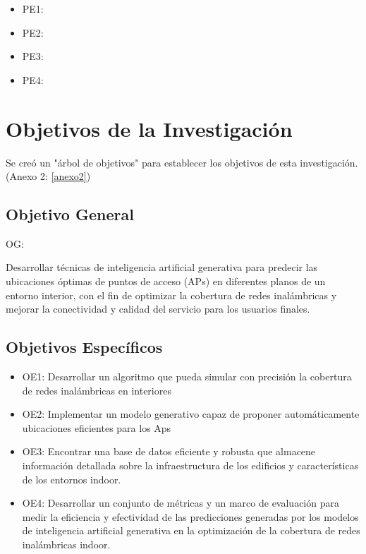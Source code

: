 \begin{itemize}
	\item PE1: {\Pbone}
	\item PE2: {\Pbtwo}
	\item PE3: {\Pbthree}
	\item PE4: {\Pbfour}
\end{itemize}

\section{Objetivos de la Investigación}
Se creó un "árbol de objetivos" para establecer los objetivos de esta investigación. (Anexo 2: \ref{anexo2})
\subsection{Objetivo General}
OG: \newcommand{\ObjetivoGeneral}{
Desarrollar técnicas de inteligencia artificial generativa para predecir las ubicaciones óptimas de puntos de acceso (APs) en diferentes planos de un entorno interior, con el fin de optimizar la cobertura de redes inalámbricas y mejorar la conectividad y calidad del servicio para los usuarios finales.
}
\ObjetivoGeneral
\subsection{Objetivos Específicos}
\newcommand{\Objone}{
Desarrollar un algoritmo que pueda simular con precisión la cobertura de redes inalámbricas en interiores
}
\newcommand{\Objtwo}{
Implementar un modelo generativo capaz de proponer automáticamente ubicaciones eficientes para los Aps
}
\newcommand{\Objthree}{
Encontrar una base de datos eficiente y robusta que almacene información detallada sobre la infraestructura de los edificios y características de los entornos indoor.
}
\newcommand{\Objfour}{
Desarrollar un conjunto de métricas y un marco de evaluación para medir la eficiencia y efectividad de las predicciones generadas por los modelos de inteligencia artificial generativa en la optimización de la cobertura de redes inalámbricas indoor.
}

\begin{itemize}
	\item OE1: {\Objone}
	\item OE2: {\Objtwo}
	\item OE3: {\Objthree}
	\item OE4: {\Objfour}
\end{itemize}

